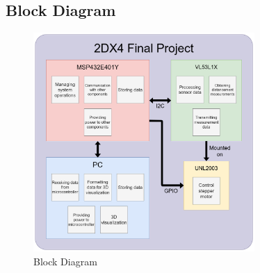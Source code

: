 \documentclass[12pt]{article}
\begin{document}
\begin{paracol}{2}
    \begin{figure}[h!]
        \centering
        \label{fig:PCDisplay}
    \end{figure}

\end{paracol}
\newpage
\subsection*{Block Diagram}
\begin{figure}[h!]
    \centering
    \includegraphics[width=0.75\textwidth]{BlockDiagram.png}
    \caption{Block Diagram}
    \label{fig:BlockDiagram}
\end{figure}
\end{document}
